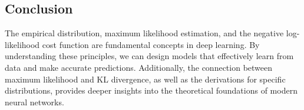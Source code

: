 \begin{notechapter}
\section{Conclusion}
The empirical distribution, maximum likelihood estimation, and the negative log-likelihood cost function are fundamental concepts in deep learning. By understanding these principles, we can design models that effectively learn from data and make accurate predictions. Additionally, the connection between maximum likelihood and KL divergence, as well as the derivations for specific distributions, provides deeper insights into the theoretical foundations of modern neural networks.
\end{notechapter}
